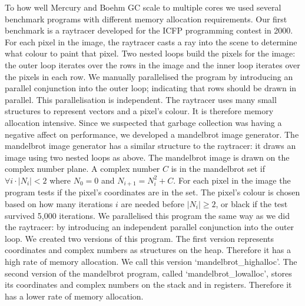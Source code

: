 To how well Mercury and Boehm GC scale to multiple cores we used several
benchmark programs with different memory allocation requirements.
Our first benchmark is a raytracer developed for the
ICFP programming contest in 2000.
For each pixel in the image,
the raytracer casts a ray into the scene to determine what colour to paint that pixel.
Two nested loops build the pixels for the image:
the outer loop iterates over the rows in the image and
the inner loop iterates over the pixels in each row.
We manually parallelised the program by introducing an parallel
conjunction into the outer loop;
indicating that rows should be drawn in parallel.
This parallelisation is independent.
The raytracer uses many small structures to represent vectors and a pixel's
colour.
It is therefore memory allocation intensive.
Since we suspected that garbage collection was having a negative affect on
performance,
we developed a mandelbrot image generator.
The mandelbrot image generator has a similar structure to the raytracer:
it draws an image using two nested loops as above.
The mandelbrot image is drawn on the complex number plane.
A complex number $C$ is in the mandelbrot set if
$\forall i \cdot |N_i| < 2$ where $N_0 = 0$ and $N_{i+1} = N_{i}^2 + C$.
For each pixel in the image the program tests if the pixel's coordinates are
in the set.
The pixel's colour is chosen based on how many iterations $i$ are needed
before $|N_i| \ge 2$,
or black if the test survived 5,000 iterations.
We parallelised this program the same way as we did the raytracer:
by introducing an independent parallel conjunction into the outer loop.
We created two versions of this program.
The first version represents coordinates and complex numbers as structures
on the heap.
Therefore it has a high rate of memory allocation.
We call this version `mandelbrot\_highalloc'.
The second version of the mandelbrot program,
called `mandelbrot\_lowalloc',
stores its coordinates and complex numbers on the stack and in registers.
Therefore it has a lower rate of memory allocation.




